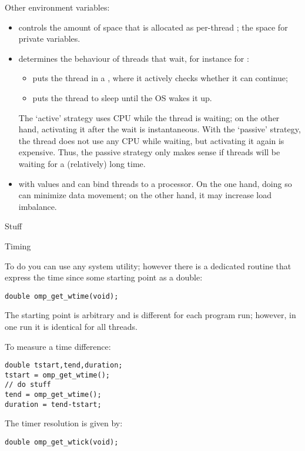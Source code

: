 Other environment variables:
\begin{itemize}
\item {} controls the amount of space that is
  allocated as per-thread ; the space for private
  variables.
\item {} determines the behaviour of
  threads that wait, for instance for :
  \begin{itemize}
  \item {} puts the thread in a , where
    it actively checks whether it can continue;
  \item {} puts the thread to sleep until the \ac{OS} wakes
    it up.
  \end{itemize}
  The `active' strategy uses CPU while the thread is waiting; on the
  other hand, activating it after the wait is instantaneous. With the
  `passive' strategy, the thread does not use any CPU while waiting,
  but activating it again is expensive. Thus, the passive strategy
  only makes sense if threads will be waiting for a (relatively) long
  time.
\item {} with values  and 
  can bind threads to a processor. On the one hand, doing so can
  minimize data movement; on the other hand, it may increase load
  imbalance.
\end{itemize}


 {Stuff}

 {Timing}

To do  you can use any system utility;
however there is a dedicated routine 
that express the time since some starting point as a double:
\begin{verbatim}
double omp_get_wtime(void);
\end{verbatim}
The starting point is arbitrary and is different for each program run;
however, in one run it is identical for all threads.

To measure a time difference:
\begin{verbatim}
double tstart,tend,duration;
tstart = omp_get_wtime();
// do stuff
tend = omp_get_wtime();
duration = tend-tstart;
\end{verbatim}
The timer resolution is given by:
\begin{verbatim}
double omp_get_wtick(void);
\end{verbatim}

